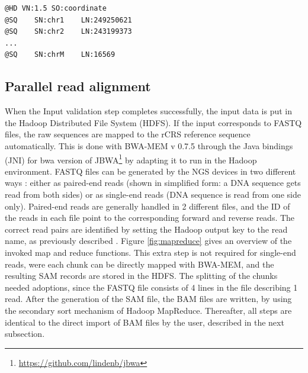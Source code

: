 \begin{lstlisting}[caption=Header of SAM/BAM file expecting length (LN) 16569 or 16571 for chrM, label=listBAMheader]
@HD VN:1.5 SO:coordinate
@SQ    SN:chr1    LN:249250621
@SQ    SN:chr2    LN:243199373
...
@SQ    SN:chrM    LN:16569
\end{lstlisting}

\subsection{Parallel read alignment}
When the Input validation step completes successfully, the input data is put in the Hadoop Distributed File System (HDFS). If the input corresponds to FASTQ files, the raw sequences are mapped to the rCRS reference sequence automatically. This is done with BWA-MEM v 0.7.5 \cite{Li2013a} through the Java bindings (JNI) for bwa version of JBWA\footnote{\url{https://github.com/lindenb/jbwa}} by adapting it to run in the Hadoop environment. FASTQ files can be generated by the NGS devices in two different ways : either as paired-end reads (shown in simplified form: a DNA sequence gets read from both sides) or as single-end reads (DNA sequence is read from one side only). Paired-end reads are generally handled in 2 different files, and the ID of the reads in each file point to the corresponding forward and reverse reads.
The correct read pairs are identified by setting the Hadoop output key to the read name, as previously described \cite{Weissensteiner2016b, Pireddu2011}. Figure \ref{fig:mapreduce} gives an overview of the invoked map and reduce functions. This extra step is not required for single-end reads, were each chunk can be directly mapped with BWA-MEM, and the resulting SAM records are stored in the HDFS. The splitting of the chunks needed adoptions, since the FASTQ file consists of 4 lines in the file describing 1 read. After the generation of the SAM file, the BAM files are written, by using the secondary sort mechanism of Hadoop MapReduce. Thereafter, all steps are identical to the direct import of BAM files by the user, described in the next subsection.

